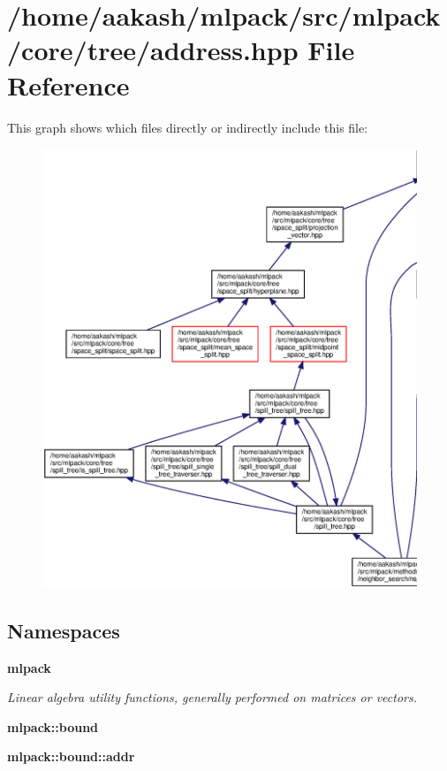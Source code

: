 \section{/home/aakash/mlpack/src/mlpack/core/tree/address.hpp File Reference}
\label{address_8hpp}
This graph shows which files directly or indirectly include this file\+:
\nopagebreak
\begin{figure}[H]
\begin{center}
\leavevmode
\includegraphics[width=350pt]{address_8hpp__dep__incl}
\end{center}
\end{figure}
\subsection*{Namespaces}
\begin{DoxyCompactItemize}
\item 
 \textbf{ mlpack}
\begin{DoxyCompactList}\small\item\em Linear algebra utility functions, generally performed on matrices or vectors. \end{DoxyCompactList}\item 
 \textbf{ mlpack\+::bound}
\item 
 \textbf{ mlpack\+::bound\+::addr}
\end{DoxyCompactItemize}
